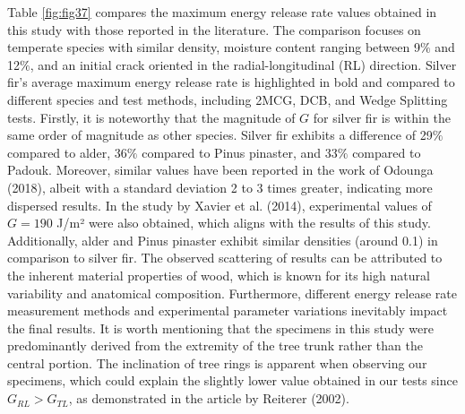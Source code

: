 Table \ref{fig:fig37} compares the maximum energy release rate values obtained in this study with those reported in the literature. The comparison focuses on temperate species with similar density, moisture content ranging between 9$\%$ and 12$\%$, and an initial crack oriented in the radial-longitudinal (RL) direction. Silver fir's average maximum energy release rate is highlighted in bold and compared to different species and test methods, including 2MCG, DCB, and Wedge Splitting tests.
Firstly, it is noteworthy that the magnitude of $G$ for silver fir is within the same order of magnitude as other species. Silver fir exhibits a difference of 29$\%$ compared to alder, 36$\%$ compared to Pinus pinaster, and 33$\%$ compared to Padouk. Moreover, similar values have been reported in the work of Odounga (2018), albeit with a standard deviation 2 to 3 times greater, indicating more dispersed results.
In the study by Xavier et al. (2014), experimental values of $G=190$ J/m² were also obtained, which aligns with the results of this study. Additionally, alder and Pinus pinaster exhibit similar densities (around 0.1) in comparison to silver fir.
The observed scattering of results can be attributed to the inherent material properties of wood, which is known for its high natural variability and anatomical composition. Furthermore, different energy release rate measurement methods and experimental parameter variations inevitably impact the final results.
It is worth mentioning that the specimens in this study were predominantly derived from the extremity of the tree trunk rather than the central portion. The inclination of tree rings is apparent when observing our specimens, which could explain the slightly lower value obtained in our tests since $G_{RL} > G_{TL}$, as demonstrated in the article by Reiterer (2002).

